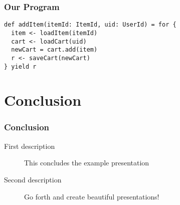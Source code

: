 \documentclass{beamer}
\begin{document}
\begin{frame}[fragile]
  \frametitle{Our Program}
\begin{verbatim}
def addItem(itemId: ItemId, uid: UserId) = for {
  item <- loadItem(itemId)
  cart <- loadCart(uid)
  newCart = cart.add(item)
  r <- saveCart(newCart)
} yield r
\end{verbatim}
\end{frame}

\section{Conclusion}

\begin{frame}
  \frametitle{Conclusion}
  \begin{description}
  \item[First description] This concludes the example presentation
  \item[Second description] Go forth and create beautiful presentations!
  \end{description}
\end{frame}
\end{document}
